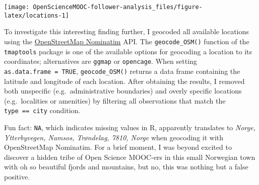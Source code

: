 \documentclass[]{article}
\newenvironment{Shaded}{\begin{snugshade}}{\end{snugshade}}
\newcommand{\KeywordTok}[1]{\textcolor[rgb]{0.13,0.29,0.53}{\textbf{#1}}}
\newcommand{\DataTypeTok}[1]{\textcolor[rgb]{0.13,0.29,0.53}{#1}}
\newcommand{\StringTok}[1]{\textcolor[rgb]{0.31,0.60,0.02}{#1}}
\newcommand{\CommentTok}[1]{\textcolor[rgb]{0.56,0.35,0.01}{\textit{#1}}}
\newcommand{\OtherTok}[1]{\textcolor[rgb]{0.56,0.35,0.01}{#1}}
\newcommand{\OperatorTok}[1]{\textcolor[rgb]{0.81,0.36,0.00}{\textbf{#1}}}
\newcommand{\NormalTok}[1]{#1}
\begin{document}
\begin{center}\texttt{[image: OpenScienceMOOC-follower-analysis\_files/figure-latex/locations-1]} \end{center}

To investigate this interesting finding further, I geocoded all
available locations using the
\href{https://wiki.openstreetmap.org/wiki/Nominatim}{OpenStreetMap
Nominatim} API. The \texttt{geocode\_OSM()} function of the
\texttt{tmaptools} package is one of the available options for geocoding
a location to its coordinates; alternatives are \texttt{ggmap} or
\texttt{opencage}. When setting \texttt{as.data.frame\ =\ TRUE},
\texttt{geocode\_OSM()} returns a data frame containing the latitude and
longitude of each location. After obtaining the results, I removed both
unspecific (e.g.~administrative boundaries) and overly specific
locations (e.g.~localities or amenities) by filtering all observations
that match the \texttt{type\ ==\ city} condition.

Fun fact: \texttt{NA}, which indicates missing values in R, apparently
translates to \emph{Norge, Ytterbyvegen, Namsos, Trøndelag, 7810, Norge}
when geocoding it with OpenStreetMap Nominatim. For a brief moment, I
was beyond excited to discover a hidden tribe of Open Science MOOC-ers
in this small Norwegian town with oh so beautiful fjords and mountains,
but no, this was nothing but a false positive.

\begin{Shaded}
\end{Shaded}
\end{document}
